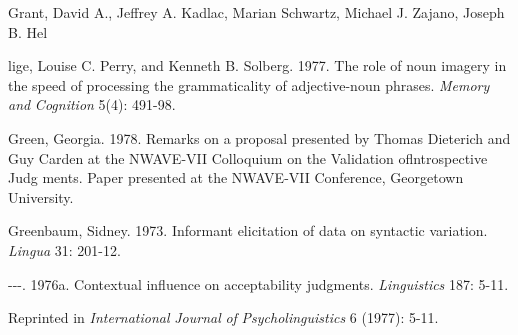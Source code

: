 \begin{styleStandard}
Grant, David A., Jeffrey A. Kadlac, Marian Schwartz, Michael J. Zajano, Joseph B. Hel\-
\end{styleStandard}


\begin{styleStandard}
lige, Louise C. Perry, and Kenneth B. Solberg. 1977. The role of noun imagery in the speed of processing the grammaticality of adjective-noun phrases. \textit{Memory}\textit{ }\textit{and}\textit{ }\textit{Cognition}\textit{ }5(4): 491-98.
\end{styleStandard}


\begin{styleStandard}
Green, Georgia. 1978. Remarks on a proposal presented by Thomas Dieterich and Guy Carden at the NWAVE-VII Colloquium on the Validation oflntrospective Judg\- ments. Paper presented at the NWAVE-VII Conference, Georgetown University.
\end{styleStandard}


\clearpage\setcounter{page}{1}\begin{styleStandard}
Greenbaum, Sidney. 1973. Informant elicitation of data on syntactic variation. \textit{Lingua}\textit{ }31: 201-12.
\end{styleStandard}


\begin{styleStandard}
{}-{}-{}-. 1976a. Contextual influence on acceptability judgments. \textit{Linguistics}\textit{ }187: 5-11.
\end{styleStandard}


\begin{styleStandard}
Reprinted in \textit{International}\textit{ }\textit{Journal}\textit{ }\textit{of}\textit{ }\textit{Psycholinguistics}\textit{ }6 (1977): 5-11.
\end{styleStandard}


